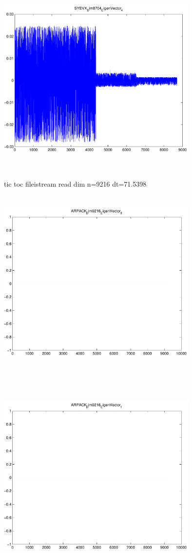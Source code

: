 \documentclass[9pt]{article}
\theoremstyle{plain}
\theoremstyle{definition}
\theoremstyle{remark}
\numberwithin{equation}{section}
\begin{document}
\includegraphics[width=10.0cm,height=10.0cm]{SYEVX_Dim8704_EigenVector_4.pdf}

tic toc fileistream read dim n=9216 dt=71.5398
\includegraphics[width=10.0cm,height=10.0cm]{ARPACK_Dim9216_EigenVector_0.pdf}

\includegraphics[width=10.0cm,height=10.0cm]{ARPACK_Dim9216_EigenVector_1.pdf}
\end{document}
